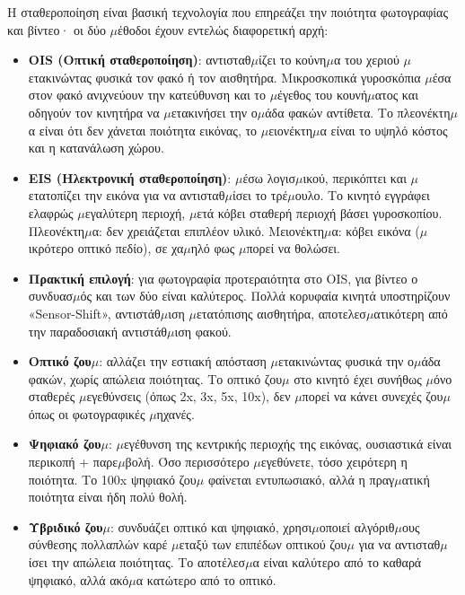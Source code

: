 Η σταθεροποίηση είναι βασική τεχνολογία που επηρεάζει την ποιότητα φωτογραφίας και βίντεο· οι δύο $\mu$έθοδοι έχουν εντελώς διαφορετική αρχή:

\begin{itemize}
  \item \textbf{OIS (Οπτική σταθεροποίηση)}: αντισταθ$\mu$ίζει το κούνη$\mu$α του χεριού $\mu$ετακινώντας φυσικά τον φακό ή τον αισθητήρα. Μικροσκοπικά γυροσκόπια $\mu$έσα στον φακό ανιχνεύουν την κατεύθυνση και το $\mu$έγεθος του κουνή$\mu$ατος και οδηγούν τον κινητήρα να $\mu$ετακινήσει την ο$\mu$άδα φακών αντίθετα. Το πλεονέκτη$\mu$α είναι ότι δεν χάνεται ποιότητα εικόνας, το $\mu$ειονέκτη$\mu$α είναι το υψηλό κόστος και η κατανάλωση χώρου.
  \item \textbf{EIS (Ηλεκτρονική σταθεροποίηση)}: $\mu$έσω λογισ$\mu$ικού, περικόπτει και $\mu$ετατοπίζει την εικόνα για να αντισταθ$\mu$ίσει το τρέ$\mu$ουλο. Το κινητό εγγράφει ελαφρώς $\mu$εγαλύτερη περιοχή, $\mu$ετά κόβει σταθερή περιοχή βάσει γυροσκοπίου. Πλεονέκτη$\mu$α: δεν χρειάζεται επιπλέον υλικό. Μειονέκτη$\mu$α: κόβει εικόνα ($\mu$ικρότερο οπτικό πεδίο), σε χα$\mu$ηλό φως $\mu$πορεί να θολώσει.
  \item \textbf{Πρακτική επιλογή}: για φωτογραφία προτεραιότητα στο OIS, για βίντεο ο συνδυασ$\mu$ός και των δύο είναι καλύτερος. Πολλά κορυφαία κινητά υποστηρίζουν «Sensor-Shift», αντιστάθ$\mu$ιση $\mu$ετατόπισης αισθητήρα, αποτελεσ$\mu$ατικότερη από την παραδοσιακή αντιστάθ$\mu$ιση φακού.
\end{itemize}


\begin{itemize}
  \item \textbf{Οπτικό ζου$\mu$}: αλλάζει την εστιακή απόσταση $\mu$ετακινώντας φυσικά την ο$\mu$άδα φακών, χωρίς απώλεια ποιότητας. Το οπτικό ζου$\mu$ στο κινητό έχει συνήθως $\mu$όνο σταθερές $\mu$εγεθύνσεις (όπως 2x, 3x, 5x, 10x), δεν $\mu$πορεί να κάνει συνεχές ζου$\mu$ όπως οι φωτογραφικές $\mu$ηχανές.
  \item \textbf{Ψηφιακό ζου$\mu$}: $\mu$εγέθυνση της κεντρικής περιοχής της εικόνας, ουσιαστικά είναι περικοπή + παρε$\mu$βολή. Όσο περισσότερο $\mu$εγεθύνετε, τόσο χειρότερη η ποιότητα. Το 100x ψηφιακό ζου$\mu$ φαίνεται εντυπωσιακό, αλλά η πραγ$\mu$ατική ποιότητα είναι ήδη πολύ θολή.
  \item \textbf{Υβριδικό ζου$\mu$}: συνδυάζει οπτικό και ψηφιακό, χρησι$\mu$οποιεί αλγόριθ$\mu$ους σύνθεσης πολλαπλών καρέ $\mu$εταξύ των επιπέδων οπτικού ζου$\mu$ για να αντισταθ$\mu$ίσει την απώλεια ποιότητας. Το αποτέλεσ$\mu$α είναι καλύτερο από το καθαρά ψηφιακό, αλλά ακό$\mu$α κατώτερο από το οπτικό.
\end{itemize}

